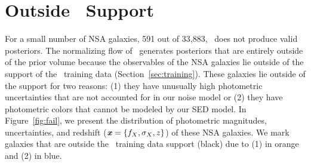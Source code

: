\section{Outside \sedflow~Support} \label{sec:fail}
For a small number of NSA galaxies, 591 out of 33,883, \sedflow~does not
produce valid posteriors. 
The normalizing flow of \sedflow~generates posteriors that are entirely outside
of the prior volume because the observables of the NSA galaxies lie outside of
the support of the \sedflow~training data (Section~\ref{sec:training}). 
These galaxies lie outside of the support for two reasons: 
(1) they have unusually high photometric uncertainties that are not accounted
for in our noise model or 
(2) they have photometric colors that cannot be modeled by our SED model. 
In Figure~\ref{fig:fail}, we present the distribution of photometric
magnitudes, uncertainties, and redshift ($\textbf{\textit{x}} = \{f_X, \sigma_X, z\}$) of
these NSA galaxies. 
We mark galaxies that are outside the \sedflow~training data support (black)
due to (1) in orange and (2) in blue. 


